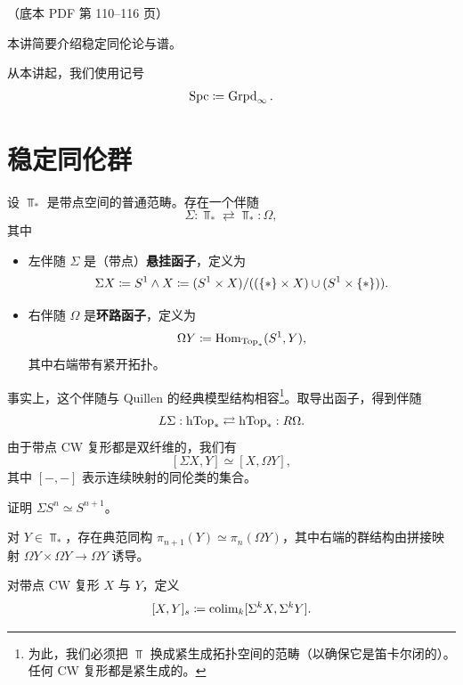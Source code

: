 \begin{center}\small\color{black!55}（底本 PDF 第 110–116 页）\end{center}

本讲简要介绍稳定同伦论与谱。

从本讲起，我们使用记号
\[
\operatorname{Spc}\coloneqq\operatorname{Grpd}_{\infty}.
\]

\section{稳定同伦群}

\nitem\label{L14-1.1} 设 $\Top_{\ast}$ 是带点空间的普通范畴。存在一个伴随
\[
\Sigma:\Top_{\ast}\rightleftarrows\Top_{\ast}:\Omega,
\]
其中
\begin{itemize}[leftmargin=2.2em,itemsep=0.1em]
\item 左伴随 $\Sigma$ 是（带点）\textbf{悬挂函子}，定义为
\[
\Sigma X\coloneqq S^{1}\wedge X\coloneqq (S^{1}\times X)/((\{\ast\}\times X)\cup(S^{1}\times\{\ast\})).
\]
\item 右伴随 $\Omega$ 是\textbf{环路函子}，定义为
\[
\Omega Y\coloneqq\operatorname{Hom}_{\operatorname{Top}_{\ast}}(S^{1},Y),
\]
其中右端带有紧开拓扑。
\end{itemize}

\nitem\label{L14-1.2} 事实上，这个伴随与 Quillen 的经典模型结构相容\footnote{为此，我们必须把 $\Top$ 换成紧生成拓扑空间的范畴（以确保它是笛卡尔闭的）。任何 CW 复形都是紧生成的。}。取导出函子，得到伴随
\begin{equation}\label{L14-eq1.1}
L\Sigma:\operatorname{hTop}_{\ast}\rightleftarrows\operatorname{hTop}_{\ast}:R\Omega.
\end{equation}
由于带点 CW 复形都是双纤维的，我们有
\[
[\Sigma X,Y]\simeq[X,\Omega Y],
\]
其中 $[-,-]$ 表示连续映射的同伦类的集合。

\begin{exercise}\label{L14-1.3}
证明 $\Sigma S^{n}\simeq S^{n+1}$。
\end{exercise}

\begin{exercise}\label{L14-1.4}
对 $Y\in\Top_{\ast}$，存在典范同构 $\pi_{n+1}(Y)\simeq\pi_{n}(\Omega Y)$，其中右端的群结构由拼接映射 $\Omega Y\times\Omega Y\to\Omega Y$ 诱导。
\end{exercise}

\nitem\label{L14-1.5} 对带点 CW 复形 $X$ 与 $Y$，定义
\[
[X,Y]_{s}\coloneqq\operatorname{colim}_{k}[\Sigma^{k}X,\Sigma^{k}Y].
\]

